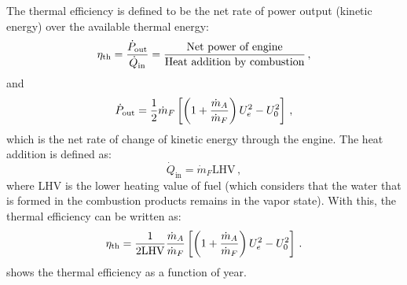 The thermal efficiency is defined to be the net rate of power output (kinetic energy) over the available thermal energy:
\begin{equation}
  \eta_\text{th} = {\frac{\dot{P}_\text{out}}{\dot{Q}_\text{in}}} = {\frac{\text{Net power of engine}}{\text{Heat addition by combustion}}} \,,
\end{equation}
and
\begin{equation}
  \dot{P}_\text{out} = {\frac{1}{2}} \dot{m}_F  \left[ \left( 1+{\frac{\dot{m}_A}{\dot{m}_F}}\right)U_e^2-U_0^2\right]\,,
\end{equation}
which is the net rate of change of kinetic energy through the engine. The heat addition is defined as:
\begin{equation}
  \dot{Q}_\text{in} = \dot{m}_F \text{LHV}\,,
\end{equation}
where LHV is the lower heating value of fuel (which considers that the water that is formed in the combustion products remains in the vapor state). With this,
the thermal efficiency can be written as:
\begin{equation}
  \eta_\text{th} = {\frac{1}{2 \text{LHV}}} {\frac{\dot{m}_A}{\dot{m}_F}} \left[ \left( 1+{\frac{\dot{m}_A}{\dot{m}_F}}\right)U_e^2-U_0^2\right]\,.
\end{equation}
 shows the thermal efficiency as a function of year.

